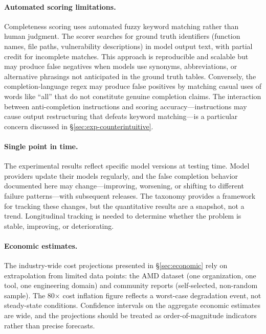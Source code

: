 \paragraph{Automated scoring limitations.}
Completeness scoring uses automated fuzzy keyword matching rather than human judgment.
The scorer searches for ground truth identifiers (function names, file paths, vulnerability descriptions) in model output text, with partial credit for incomplete matches.
This approach is reproducible and scalable but may produce false negatives when models use synonyms, abbreviations, or alternative phrasings not anticipated in the ground truth tables.
Conversely, the completion-language regex may produce false positives by matching casual uses of words like ``all'' that do not constitute genuine completion claims.
The interaction between anti-completion instructions and scoring accuracy---instructions may cause output restructuring that defeats keyword matching---is a particular concern discussed in \S\ref{sec:exp-counterintuitive}.

\paragraph{Single point in time.}
The experimental results reflect specific model versions at testing time.
Model providers update their models regularly, and the false completion behavior documented here may change---improving, worsening, or shifting to different failure patterns---with subsequent releases.
The taxonomy provides a framework for tracking these changes, but the quantitative results are a snapshot, not a trend.
Longitudinal tracking is needed to determine whether the problem is stable, improving, or deteriorating.

\paragraph{Economic estimates.}
The industry-wide cost projections presented in \S\ref{sec:economic} rely on extrapolation from limited data points: the AMD dataset (one organization, one tool, one engineering domain) and community reports (self-selected, non-random sample).
The 80$\times$ cost inflation figure reflects a worst-case degradation event, not steady-state conditions.
Confidence intervals on the aggregate economic estimates are wide, and the projections should be treated as order-of-magnitude indicators rather than precise forecasts.


